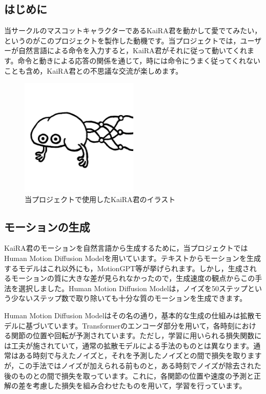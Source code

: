 \subsection{はじめに}

当サークルのマスコットキャラクターであるKaiRA君を動かして愛でてみたい，というのがこのプロジェクトを製作した動機です。当プロジェクトでは，ユーザーが自然言語による命令を入力すると，KaiRA君がそれに従って動いてくれます。命令と動きによる応答の関係を通じて，時には命令にうまく従ってくれないことも含め，KaiRA君との不思議な交流が楽しめます。

\begin{figure}[htbp]
    \centering
    \includegraphics[width=0.5\textwidth]{moving-kaira-kun/fig/kaira_kun.png}
    \caption{当プロジェクトで使用したKaiRA君のイラスト}
    \label{fig:kaira_kun}
\end{figure}

\subsection{モーションの生成}

KaiRA君のモーションを自然言語から生成するために，当プロジェクトではHuman Motion Diffusion Model\cite{tevet2022humanmotiondiffusionmodel}を用いています。テキストからモーションを生成するモデルはこれ以外にも，MotionGPT\cite{jiang2023motiongpthumanmotionforeign}等が挙げられます。しかし，生成されるモーションの質に大きな差が見られなかったので，生成速度の観点からこの手法を選択しました。Human Motion Diffusion Modelは，ノイズを50ステップという少ないステップ数で取り除いても十分な質のモーションを生成できます。

Human Motion Diffusion Modelはその名の通り，基本的な生成の仕組みは拡散モデルに基づいています。Transformerのエンコーダ部分を用いて，各時刻における関節の位置や回転が予測されています。ただし，学習に用いられる損失関数には工夫が施されていて，通常の拡散モデルによる手法のものとは異なります。通常はある時刻で与えたノイズと，それを予測したノイズとの間で損失を取りますが，この手法ではノイズが加えられる前ものと，ある時刻でノイズが除去された後のものとの間で損失を取っています。これに，各関節の位置や速度の予測と正解の差を考慮した損失を組み合わせたものを用いて，学習を行っています。

